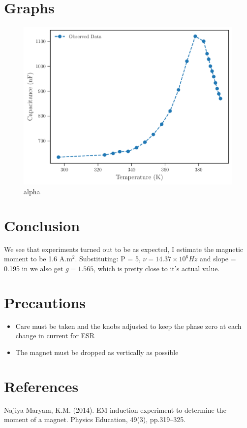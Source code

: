 \documentclass{ieeeconf}
\begin{document}
\section{Graphs}
\begin{figure}[H]
\centering
\includegraphics[width = \columnwidth]{./Capacitance.pdf}
\caption{alpha}
\label{fig:"alpha"}
\end{figure}
\section{Conclusion}
We see that experiments turned out to be as expected, I estimate the magnetic moment to be 1.6 A.m\(^2\). Substituting: P = 5, \(\nu = 14.37 \times 10^6 Hz\) and slope = 0.195 in we also get \(g = 1.565\), which is pretty close to it's actual value.
\section{Precautions}
\begin{itemize}
\tightlist
\item
Care must be taken and the knobs adjusted to keep the phase zero at each change in current for ESR
\item
The magnet must be dropped as vertically as possible
\end{itemize}
\section{References}
Najiya Maryam, K.M. (2014). EM induction experiment to determine the moment of a magnet. Physics Education, 49(3), pp.319--325.
\clearpage
\end{document}
